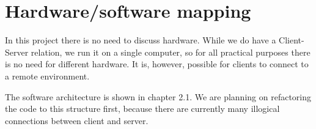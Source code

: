 \section{Hardware/software mapping}
In this project there is no need to discuss hardware. While we do have a Client-Server relation, we run it on a single computer, so for all practical purposes there is no need for different hardware. It is, however, possible for clients to connect to a remote environment.

The software architecture is shown in chapter 2.1. We are planning on refactoring the code to this structure first, because there are currently many illogical connections between client and server.